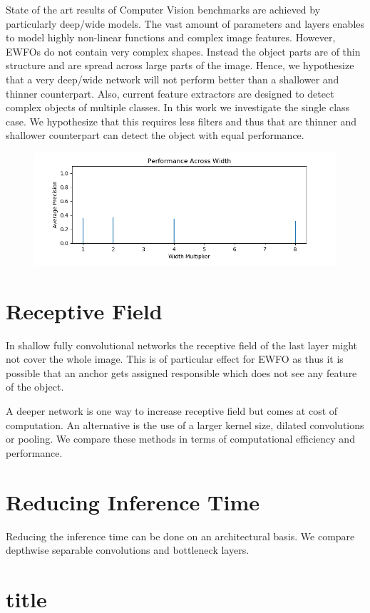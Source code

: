 	State of the art results of Computer Vision benchmarks are achieved by particularly deep/wide models. The vast amount of parameters and layers enables to model highly non-linear functions and complex image features. However, \acp{EWFO} do not contain very complex shapes. Instead the object parts are of thin structure and are spread across large parts of the image. Hence, we hypothesize that a very deep/wide network will not perform better than a shallower and thinner counterpart. Also, current feature extractors are designed to detect complex objects of multiple classes. In this work we investigate the single class case. We hypothesize that this requires less filters and thus that are thinner and shallower counterpart can detect the object with equal performance.
	
	\begin{figure}
		\includegraphics[width=\textwidth]{fig/perf_width}
	\end{figure}
	
	\section{Receptive Field}
	
	In shallow fully convolutional networks the receptive field of the last layer might not cover the whole image. This is of particular effect for \ac{EWFO} as thus it is possible that an anchor gets assigned responsible which does not see any feature of the object.
	
	A deeper network is one way to increase receptive field but comes at cost of computation. An alternative is the use of a larger kernel size, dilated convolutions or pooling. We compare these methods in terms of computational efficiency and performance.
		
	\section{Reducing Inference Time}
	
	Reducing the inference time can be done on an architectural basis. We compare depthwise separable convolutions and bottleneck layers.
	
	\section{title}